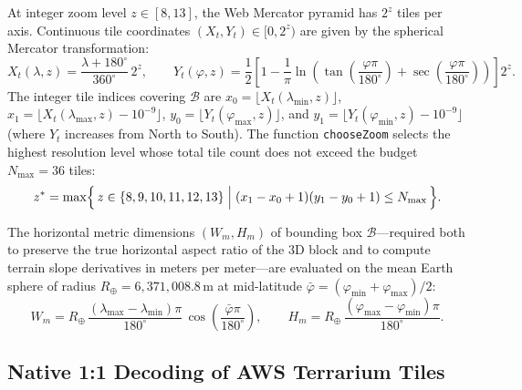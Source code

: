 \documentclass[11pt,a4paper]{article}
\newcommand{\unit}[1]{\mathrm{#1}}
\begin{document}
At integer zoom level $z\in[8,13]$, the Web Mercator pyramid has $2^z$ tiles per axis. Continuous tile coordinates $(X_t,Y_t)\in[0,2^z)$ are given by the spherical Mercator transformation:
\begin{equation}
  X_t(\lambda,z) = \frac{\lambda + 180^\circ}{360^\circ}\,2^z,
  \qquad
  Y_t(\varphi,z) = \frac{1}{2}\left[
    1 - \frac{1}{\pi}\ln\!\left(\tan\!\left(\frac{\varphi\pi}{180^\circ}\right)
    + \sec\!\left(\frac{\varphi\pi}{180^\circ}\right)\right)
  \right] 2^z .
  \label{eq:mercator-tiles}
\end{equation}
The integer tile indices covering $\mathcal{B}$ are $x_0=\lfloor X_t(\lambda_{\min},z)\rfloor$, $x_1=\lfloor X_t(\lambda_{\max},z)-10^{-9}\rfloor$, $y_0=\lfloor Y_t(\varphi_{\max},z)\rfloor$, and $y_1=\lfloor Y_t(\varphi_{\min},z)-10^{-9}\rfloor$ (where $Y_t$ increases from North to South). The function \texttt{chooseZoom} selects the highest resolution level whose total tile count does not exceed the budget $N_{\max}=36$ tiles:
\begin{equation}
  z^\ast = \max\Bigl\{\, z\in\{8,9,10,11,12,13\} \;\Big|\;
  (x_1 - x_0 + 1)(y_1 - y_0 + 1) \le N_{\max} \,\Bigr\}.
  \label{eq:choose-zoom}
\end{equation}

The horizontal metric dimensions $(W_m,H_m)$ of bounding box $\mathcal{B}$---required both to preserve the true horizontal aspect ratio of the 3D block and to compute terrain slope derivatives in meters per meter---are evaluated on the mean Earth sphere of radius $R_\oplus = 6,371,008.8\,\unit{m}$ at mid-latitude $\bar\varphi = (\varphi_{\min}+\varphi_{\max})/2$:
\begin{equation}
  W_m = R_\oplus\,\frac{(\lambda_{\max}-\lambda_{\min})\pi}{180^\circ}\,\cos\!\left(\frac{\bar\varphi\pi}{180^\circ}\right),
  \qquad
  H_m = R_\oplus\,\frac{(\varphi_{\max}-\varphi_{\min})\pi}{180^\circ}.
  \label{eq:bbox-metros}
\end{equation}

\subsection{Native 1:1 Decoding of AWS Terrarium Tiles}
\label{sec:relieve3d-terrarium}
\end{document}

